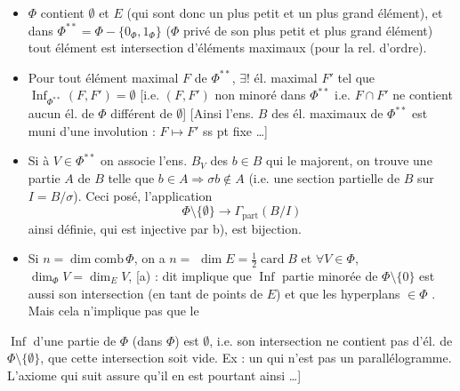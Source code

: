 \documentclass[11pt,a4paper]{article}
\begin{document}
\begin{itemize}
  \item[a)] $\Phi$ 
    contient $\emptyset$ et $E$ (qui sont donc un plus petit et un plus grand
    élément), et dans $\Phi^{**} = \Phi - \{ 0_\Phi, 1_\Phi \}$ ($\Phi$ privé
    de son plus petit et plus grand élément) tout élément est intersection
    d'éléments maximaux (pour la rel. d'ordre).
  \item[b)] Pour tout élément maximal $F$ de $\Phi^{**}$, $\exists !$ él.
    maximal $F'$ tel que $\operatorname{Inf}_{\Phi^{**}}(F, F') = \emptyset$
    [i.e. $(F, F')$ non minoré dans $\Phi^{**}$ i.e. $F \cap F'$ ne contient
    aucun él. de $\Phi$ différent de $\emptyset$] [Ainsi l'ens. $B$ des él.
    maximaux de $\Phi^{**}$ est muni d'une involution : $F \mapsto F'$ ss pt
    fixe …]
  \item[c)] Si \struck{:} à  $V \in \Phi^{**}$
     on associe l'ens. \struck{\ill{}} $B_V$ des
    $b \in B$ qui le majorent, on trouve une partie $A$ de $B$ telle que
    $b \in A \Rightarrow \sigma b \notin A$ (i.e. une section partielle
     de $B$ sur $I = B/\sigma$). Ceci posé, l'application
    \[
      \Phi \setminus \{\emptyset\} \longrightarrow \Gamma_{\mathrm{part}}(B/I)
    \]
    ainsi définie, qui est injective par b), est bijection.
  \item[d)] Si $n = \dim \mathrm{comb}\, \Phi$, on a 
    $n =$ \struck{\ill{}} $\dim E = \frac{1}{2} \operatorname{card} B$ et
    $\forall V \in \Phi$, $\dim_\Phi V = \dim_E V$, \ill{}
    [a) : dit implique que  $\operatorname{Inf}$
      partie minorée de
    $\Phi \setminus \{0\}$ est aussi son intersection (en tant
     de points de $E$) et que les hyperplans $\in \Phi$
    \ill{}. Mais cela n'implique pas que le
\end{itemize}


$\operatorname{Inf}$ d'une partie de $\Phi$ (dans $\Phi$) est $\emptyset$,
i.e.  son intersection ne contient pas d'él. de
$\Phi \setminus \{\emptyset\}$, que cette intersection soit vide. Ex : un
 qui n'est pas un parallélogramme.
L'axiome qui suit assure qu'il en est pourtant ainsi …]
\end{document}

